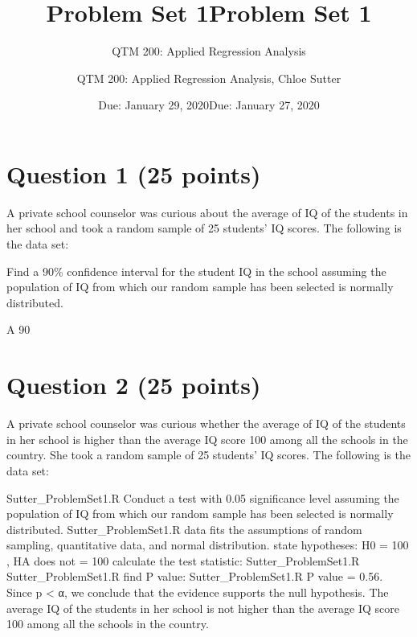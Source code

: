 \documentclass[12pt,letterpaper]{article}
\title{Problem Set 1}
\date{Due: January 29, 2020}
\author{QTM 200: Applied Regression Analysis}
\begin{document}




\title{Problem Set 1}
\date{Due: January 27, 2020}
\author{QTM 200: Applied Regression Analysis, Chloe Sutter}


\section*{Question 1 (25 points)}
A private school counselor was curious about the average of IQ of the students in her school and took a random sample of 25 students' IQ scores. The following is the data set:
  
\vspace{.5cm}
\noindent Find a 90\% confidence interval for the student IQ in the school assuming the population of IQ from which our random sample has been selected is normally distributed. 
\vspace{1cm} 

\vsapce{.5cm}
\noindent A 90%
\vspace{1cm}

\section*{Question 2 (25 points)}
A private school counselor was curious  whether  the average of IQ of the students in her school is higher than the average IQ score 100 among all the schools in the country. She took a random sample of 25 students' IQ scores. The following is the data set:
\vspace{.5cm}

\vspace{.5cm}
 {Sutter_ProblemSet1.R}
\noindent Conduct a test with 0.05 significance level assuming the population of IQ from which our random sample has been selected is normally distributed. 
\vspace{.5cm}
 {Sutter_ProblemSet1.R}
\noindent data fits the assumptions of random sampling, quantitative data, and normal distribution.
\noindent state hypotheses: H0 = 100 , HA does not = 100
\noindent calculate the test statistic:
 {Sutter_ProblemSet1.R}
 {Sutter_ProblemSet1.R}
\noindent find P value:
 {Sutter_ProblemSet1.R}
\noindent P value = 0.56. Since p < α, we conclude that the evidence supports the null hypothesis. The average IQ of the students in her school is not higher than the average IQ score 100 among all the schools in the country.
\end{document}
